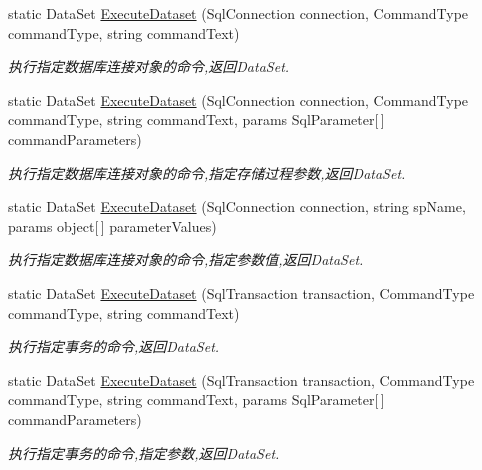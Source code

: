 \begin{DoxyCompactItemize}
static Data\-Set \hyperlink{class_x_c_l_net_tools_1_1_data_base_1_1_m_s_s_q_l_1_1_sql_helper_abf0f5857e88b9f414b00da132dafaebd}{Execute\-Dataset} (Sql\-Connection connection, Command\-Type command\-Type, string command\-Text)
\begin{DoxyCompactList}\small\item\em 执行指定数据库连接对象的命令,返回\-Data\-Set. \end{DoxyCompactList}\item 
static Data\-Set \hyperlink{class_x_c_l_net_tools_1_1_data_base_1_1_m_s_s_q_l_1_1_sql_helper_acf57601c0916a0c6d4f99974ea1de3b3}{Execute\-Dataset} (Sql\-Connection connection, Command\-Type command\-Type, string command\-Text, params Sql\-Parameter\mbox{[}$\,$\mbox{]} command\-Parameters)
\begin{DoxyCompactList}\small\item\em 执行指定数据库连接对象的命令,指定存储过程参数,返回\-Data\-Set. \end{DoxyCompactList}\item 
static Data\-Set \hyperlink{class_x_c_l_net_tools_1_1_data_base_1_1_m_s_s_q_l_1_1_sql_helper_a7fdbbb72fa9cb66dc60b3a17ba417c50}{Execute\-Dataset} (Sql\-Connection connection, string sp\-Name, params object\mbox{[}$\,$\mbox{]} parameter\-Values)
\begin{DoxyCompactList}\small\item\em 执行指定数据库连接对象的命令,指定参数值,返回\-Data\-Set. \end{DoxyCompactList}\item 
static Data\-Set \hyperlink{class_x_c_l_net_tools_1_1_data_base_1_1_m_s_s_q_l_1_1_sql_helper_ab749cf9d9c40a450a3e4cb95b9429b0e}{Execute\-Dataset} (Sql\-Transaction transaction, Command\-Type command\-Type, string command\-Text)
\begin{DoxyCompactList}\small\item\em 执行指定事务的命令,返回\-Data\-Set. \end{DoxyCompactList}\item 
static Data\-Set \hyperlink{class_x_c_l_net_tools_1_1_data_base_1_1_m_s_s_q_l_1_1_sql_helper_a75ca98f1b6021f07cd950802fc935866}{Execute\-Dataset} (Sql\-Transaction transaction, Command\-Type command\-Type, string command\-Text, params Sql\-Parameter\mbox{[}$\,$\mbox{]} command\-Parameters)
\begin{DoxyCompactList}\small\item\em 执行指定事务的命令,指定参数,返回\-Data\-Set. \end{DoxyCompactList}\item 

\end{DoxyCompactItemize}
